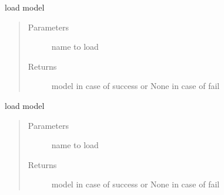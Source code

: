 \documentclass[letterpaper,10pt,english]{sphinxmanual}
\begin{document}
\begin{fulllineitems}
\label{\detokenize{algorithms:repository.repository_service.load_job_lib_model}}
\sphinxAtStartPar
load model
\begin{quote}\begin{description}
\item[{Parameters}] \leavevmode
\sphinxAtStartPar
{} \textendash{} name to load

\item[{Returns}] \leavevmode
\sphinxAtStartPar
model in case of success or None in case of fail

\end{description}\end{quote}

\end{fulllineitems}


\begin{fulllineitems}
\label{\detokenize{algorithms:repository.repository_service.load_model}}
\sphinxAtStartPar
load model
\begin{quote}\begin{description}
\item[{Parameters}] \leavevmode
\sphinxAtStartPar
{} \textendash{} name to load

\item[{Returns}] \leavevmode
\sphinxAtStartPar
model in case of success or None in case of fail

\end{description}\end{quote}

\end{fulllineitems}

\end{document}

